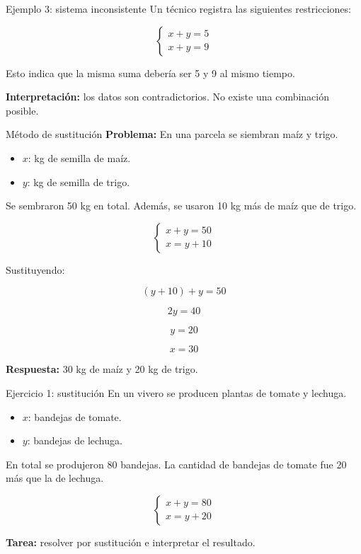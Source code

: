 \documentclass{beamer}
\begin{document}
	\begin{frame}{Ejemplo 3: sistema inconsistente}
		Un técnico registra las siguientes restricciones:
		
		\[
		\begin{cases}
			x + y = 5 \\
			x + y = 9
		\end{cases}
		\]
		
		\bigskip
		
		Esto indica que la misma suma debería ser 5 y 9 al mismo tiempo.
		
		\bigskip
		
		\textbf{Interpretación:} los datos son contradictorios. No existe una combinación posible.
	\end{frame}
	
	\begin{frame}{Método de sustitución}
		\textbf{Problema:}  
		En una parcela se siembran maíz y trigo.
		
		\begin{itemize}
			\item $x$: kg de semilla de maíz.
			\item $y$: kg de semilla de trigo.
		\end{itemize}
		
		Se sembraron 50 kg en total. Además, se usaron 10 kg más de maíz que de trigo.
		
		\[
		\begin{cases}
			x + y = 50 \\
			x = y + 10
		\end{cases}
		\]
		
		Sustituyendo:
		
		\[
		(y+10)+y=50
		\]
		
		\[
		2y=40
		\]
		
		\[
		y=20
		\]
		
		\[
		x=30
		\]
		
		\textbf{Respuesta:} 30 kg de maíz y 20 kg de trigo.
	\end{frame}
	
	\begin{frame}{Ejercicio 1: sustitución}
		En un vivero se producen plantas de tomate y lechuga.
		
		\begin{itemize}
			\item $x$: bandejas de tomate.
			\item $y$: bandejas de lechuga.
		\end{itemize}
		
		En total se produjeron 80 bandejas.  
		La cantidad de bandejas de tomate fue 20 más que la de lechuga.
		
		\[
		\begin{cases}
			x + y = 80 \\
			x = y + 20
		\end{cases}
		\]
		
		\bigskip
		
		\textbf{Tarea:} resolver por sustitución e interpretar el resultado.
	\end{frame}
	
\end{document}
